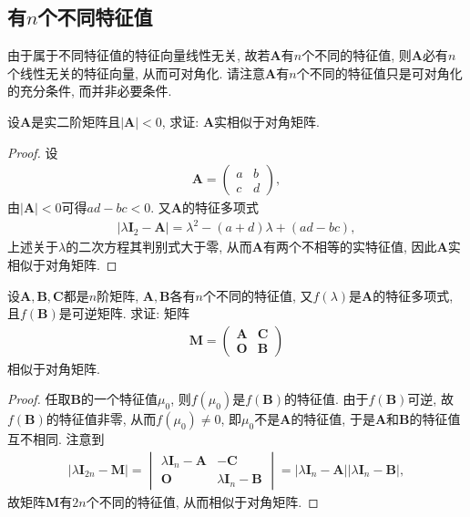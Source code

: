 \documentclass[../../main.tex]{subfiles}%
\begin{document}
\subsection{有$n$个不同特征值}

由于属于不同特征值的特征向量线性无关, 故若$\boldsymbol{A}$有$n$个不同的特征值, 则$\boldsymbol{A}$必有$n$个线性无关的特征向量, 从而可对角化. 请注意$\boldsymbol{A}$有$n$个不同的特征值只是可对角化的充分条件, 而并非必要条件. 

\begin{example}
设$\boldsymbol{A}$是实二阶矩阵且$|\boldsymbol{A}|< 0$, 求证: $\boldsymbol{A}$实相似于对角矩阵.
\end{example}
\begin{proof}

设
\begin{align*}
\boldsymbol{A}=\begin{pmatrix}
a&b\\
c&d
\end{pmatrix},
\end{align*}
由$|\boldsymbol{A}|< 0$可得$ad - bc< 0$. 又$\boldsymbol{A}$的特征多项式
\begin{align*}
|\lambda\boldsymbol{I}_2-\boldsymbol{A}|=\lambda^2-(a + d)\lambda+(ad - bc),
\end{align*}
上述关于$\lambda$的二次方程其判别式大于零, 从而$\boldsymbol{A}$有两个不相等的实特征值, 因此$\boldsymbol{A}$实相似于对角矩阵.

\end{proof}

\begin{example}
设$\boldsymbol{A},\boldsymbol{B},\boldsymbol{C}$都是$n$阶矩阵, $\boldsymbol{A},\boldsymbol{B}$各有$n$个不同的特征值, 又$f(\lambda)$是$\boldsymbol{A}$的特征多项式, 且$f(\boldsymbol{B})$是可逆矩阵. 求证: 矩阵
\begin{align*}
\boldsymbol{M}=\begin{pmatrix}
\boldsymbol{A}&\boldsymbol{C}\\
\boldsymbol{O}&\boldsymbol{B}
\end{pmatrix}
\end{align*}
相似于对角矩阵.
\end{example}
\begin{proof}

任取$\boldsymbol{B}$的一个特征值$\mu_0$, 则$f(\mu_0)$是$f(\boldsymbol{B})$的特征值. 由于$f(\boldsymbol{B})$可逆, 故$f(\boldsymbol{B})$的特征值非零, 从而$f(\mu_0)\neq 0$, 即$\mu_0$不是$\boldsymbol{A}$的特征值, 于是$\boldsymbol{A}$和$\boldsymbol{B}$的特征值互不相同. 注意到
\begin{align*}
|\lambda\boldsymbol{I}_{2n}-\boldsymbol{M}|=\begin{vmatrix}
\lambda\boldsymbol{I}_n-\boldsymbol{A}&-\boldsymbol{C}\\
\boldsymbol{O}&\lambda\boldsymbol{I}_n-\boldsymbol{B}
\end{vmatrix}=|\lambda\boldsymbol{I}_n-\boldsymbol{A}||\lambda\boldsymbol{I}_n-\boldsymbol{B}|,
\end{align*}
故矩阵$\boldsymbol{M}$有$2n$个不同的特征值, 从而相似于对角矩阵.

\end{proof}
\end{document}
